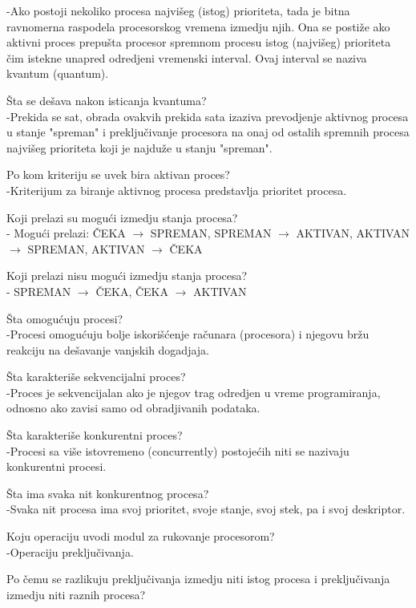 \documentclass{article}
\begin{document}
-Ako postoji nekoliko procesa najvišeg (istog) prioriteta, tada je
bitna ravnomerna raspodela procesorskog vremena izmedju njih. Ona se postiže ako aktivni proces prepušta procesor spremnom procesu istog (najvišeg) prioriteta čim
istekne unapred odredjeni vremenski interval. Ovaj interval se naziva kvantum
(quantum).
\item Šta se dešava nakon isticanja kvantuma?\\
-Prekida se sat, obrada ovakvih
prekida sata izaziva prevodjenje aktivnog procesa u stanje "spreman" i preključivanje
procesora na onaj od ostalih spremnih procesa najvišeg prioriteta koji je najduže u stanju
"spreman".
\item Po kom kriteriju se uvek bira aktivan proces?\\
-Kriterijum za biranje aktivnog procesa predstavlja prioritet procesa.
\item Koji prelazi su mogući izmedju stanja procesa?\\
- Mogući prelazi: ČEKA $\rightarrow$ SPREMAN, SPREMAN $\rightarrow$ AKTIVAN,
 AKTIVAN $\rightarrow$ SPREMAN, AKTIVAN $\rightarrow$ ČEKA
\item Koji prelazi nisu mogući izmedju stanja procesa?\\
- SPREMAN $\rightarrow$ ČEKA, ČEKA $\rightarrow$ AKTIVAN
\item Šta omogućuju procesi?\\
-Procesi omogućuju bolje iskorišćenje računara (procesora) i njegovu bržu reakciju na
dešavanje vanjskih dogadjaja.
\item Šta karakteriše sekvencijalni proces? \\
-Proces je sekvencijalan ako je njegov trag
odredjen u vreme programiranja, odnosno ako zavisi samo od obradjivanih podataka.
\item Šta karakteriše konkurentni proces?\\
-Procesi sa više istovremeno (concurrently) postojećih niti se nazivaju konkurentni
procesi.
\item Šta ima svaka nit konkurentnog procesa?\\
-Svaka nit procesa ima svoj prioritet, svoje
stanje, svoj stek, pa i svoj deskriptor.
\item Koju operaciju uvodi modul za rukovanje procesorom?\\
-Operaciju preključivanja.
\item Po čemu se razlikuju preključivanja izmedju niti istog procesa i preključivanja
izmedju niti raznih procesa?\\
\end{document}

